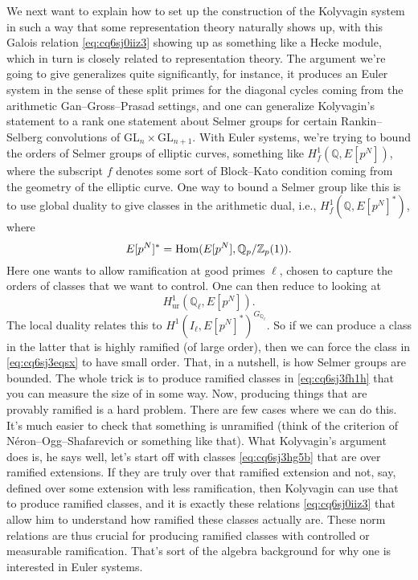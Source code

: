 \documentclass[reqno]{amsart} 
\numberwithin{theorem}{section}
\numberwithin{equation}{section}
\numberwithin{exercise}{section}
\begin{document}
We next want to explain how to set up the construction of the Kolyvagin system in such a way that some representation theory naturally shows up, with this Galois relation \eqref{eq:cq6sj0iiz3} showing up as something like a Hecke module, which in turn is closely related to representation theory.  The argument we're going to give generalizes quite significantly, for instance, it produces an Euler system in the sense of these split primes for the diagonal cycles coming from the arithmetic Gan--Gross--Prasad settings, and one can generalize Kolyvagin's statement to a rank one statement about Selmer groups for certain Rankin--Selberg convolutions of $\mathrm{GL}_n \times\mathrm{GL}_{n + 1}$.  With Euler systems, we're trying to bound the orders of Selmer groups of elliptic curves, something like $H^1_f(\mathbb{Q}, E[p^N])$, where the subscript $f$ denotes some sort of Block--Kato condition coming from the geometry of the elliptic curve.  One way to bound a Selmer group like this is to use global duality to give classes in the arithmetic dual, i.e., $H_f^1(\mathbb{Q}, E[p^N]^\ast )$, where
\begin{equation}\label{eq:cq6sj3fh1h}
  E[p^N]^\ast = \operatorname{Hom}(E[p^N], \mathbb{Q}_p / \mathbb{Z}_p(1)).
\end{equation}
Here one wants to allow ramification at good primes $\ell$, chosen to capture the orders of classes that we want to control.  One can then reduce to looking at
\begin{equation}\label{eq:cq6sj3eqsx}
  H^1_{\mathrm{ur}}(\mathbb{Q}_{\ell}, E[p^N]).
\end{equation}
The local duality relates this to $H^1(I_{\ell}, E[p^N]^\ast)^{G_{\mathbb{Q}_{\ell}}}$.  So if we can produce a class in the latter that is highly ramified (of large order), then we can force the class in \eqref{eq:cq6sj3eqsx} to have small order.  That, in a nutshell, is how Selmer groups are bounded.  The whole trick is to produce ramified classes in \eqref{eq:cq6sj3fh1h} that you can measure the size of in some way.  Now, producing things that are provably ramified is a hard problem.  There are few cases where we can do this.  It's much easier to check that something is unramified (think of the criterion of Néron--Ogg--Shafarevich or something like that).  What Kolyvagin's argument does is, he says well, let's start off with classes \eqref{eq:cq6sj3hg5b} that are over ramified extensions.  If they are truly over that ramified extension and not, say, defined over some extension with less ramification, then Kolyvagin can use that to produce ramified classes, and it is exactly these relations \eqref{eq:cq6sj0iiz3} that allow him to understand how ramified these classes actually are.  These norm relations are thus crucial for producing ramified classes with controlled or measurable ramification.  That's sort of the algebra background for why one is interested in Euler systems.
\end{document}
